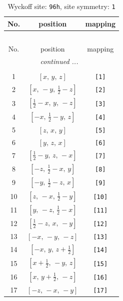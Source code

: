 \documentclass[fleqn,8pt]{jsarticle}
\begin{document}
\begin{longtable}{ccc}
\caption{Wyckoff site: {\tt 96h}, site symmetry: {\tt 1}}
 \\
 \hline \hline
No. & position & mapping \\ \hline \endfirsthead

\multicolumn{2}{l}{\tablename\ \thetable{}} \\
 \hline \hline
No. & position & mapping \\ \hline \endhead

 \hline \hline
\multicolumn{2}{r}{\footnotesize\it continued ...} \\ \endfoot

 \hline \hline
\multicolumn{2}{r}{} \\ \endlastfoot

1 & $\left[ x,\, y,\, z \right]$ & {\tt [1]} \\ \hline
2 & $\left[ x,\, - y,\, \frac{1}{2} - z \right]$ & {\tt [2]} \\ \hline
3 & $\left[ \frac{1}{2} - x,\, y,\, - z \right]$ & {\tt [3]} \\ \hline
4 & $\left[ - x,\, \frac{1}{2} - y,\, z \right]$ & {\tt [4]} \\ \hline
5 & $\left[ z,\, x,\, y \right]$ & {\tt [5]} \\ \hline
6 & $\left[ y,\, z,\, x \right]$ & {\tt [6]} \\ \hline
7 & $\left[ \frac{1}{2} - y,\, z,\, - x \right]$ & {\tt [7]} \\ \hline
8 & $\left[ - z,\, \frac{1}{2} - x,\, y \right]$ & {\tt [8]} \\ \hline
9 & $\left[ - y,\, \frac{1}{2} - z,\, x \right]$ & {\tt [9]} \\ \hline
10 & $\left[ z,\, - x,\, \frac{1}{2} - y \right]$ & {\tt [10]} \\ \hline
11 & $\left[ y,\, - z,\, \frac{1}{2} - x \right]$ & {\tt [11]} \\ \hline
12 & $\left[ \frac{1}{2} - z,\, x,\, - y \right]$ & {\tt [12]} \\ \hline
13 & $\left[ - x,\, - y,\, - z \right]$ & {\tt [13]} \\ \hline
14 & $\left[ - x,\, y,\, z + \frac{1}{2} \right]$ & {\tt [14]} \\ \hline
15 & $\left[ x + \frac{1}{2},\, - y,\, z \right]$ & {\tt [15]} \\ \hline
16 & $\left[ x,\, y + \frac{1}{2},\, - z \right]$ & {\tt [16]} \\ \hline
17 & $\left[ - z,\, - x,\, - y \right]$ & {\tt [17]} \\ \hline

\end{longtable}
\end{document}
